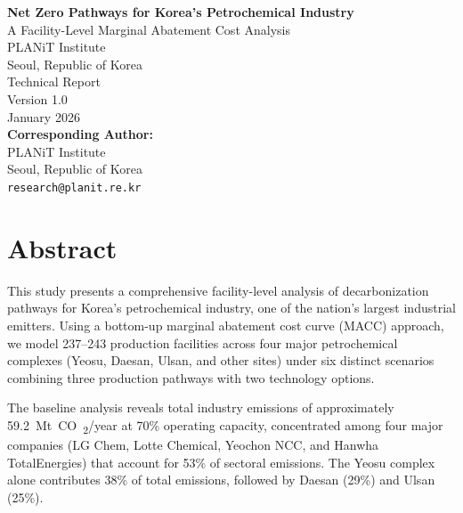\documentclass[12pt,a4paper]{article}
\newcommand{\COtwo}{CO\textsubscript{2}}
\begin{document}
\begin{titlepage}
\centering
\vspace*{2cm}

{\LARGE\bfseries Net Zero Pathways for Korea's Petrochemical Industry}\\[0.5cm]
{\Large A Facility-Level Marginal Abatement Cost Analysis}\\[2cm]

{\large PLANiT Institute}\\
{\normalsize Seoul, Republic of Korea}\\[1cm]

{\large Technical Report}\\[0.5cm]
{\normalsize Version 1.0}\\[2cm]

{\large January 2026}\\[3cm]

\vfill
{\small
\textbf{Corresponding Author:}\\
PLANiT Institute\\
Seoul, Republic of Korea\\
\texttt{research@planit.re.kr}
}

\end{titlepage}

\newpage
\section*{Abstract}

This study presents a comprehensive facility-level analysis of decarbonization pathways for Korea's petrochemical industry, one of the nation's largest industrial emitters. Using a bottom-up marginal abatement cost curve (MACC) approach, we model 237--243 production facilities across four major petrochemical complexes (Yeosu, Daesan, Ulsan, and other sites) under six distinct scenarios combining three production pathways with two technology options.

The baseline analysis reveals total industry emissions of approximately \SI{59.2}{Mt~\COtwo/year} at 70\% operating capacity, concentrated among four major companies (LG Chem, Lotte Chemical, Yeochon NCC, and Hanwha TotalEnergies) that account for 53\% of sectoral emissions. The Yeosu complex alone contributes 38\% of total emissions, followed by Daesan (29\%) and Ulsan (25\%).
\end{document}
